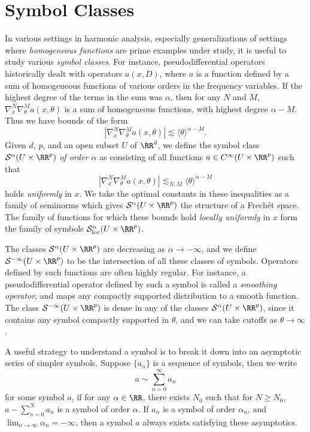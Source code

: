 \chapter{Symbol Classes}

In various settings in harmonic analysis, especially generalizations of settings where \emph{homogeneous functions} are prime examples under study, it is useful to study various \emph{symbol classes}. For instance, pseudodifferential operators historically dealt with operators $a(x,D)$, where $a$ is a function defined by a sum of homogeneous functions of various orders in the frequency variables. If the highest degree of the terms in the sum was $\alpha$, then for any $N$ and $M$, $\nabla^N_x \nabla^M_\theta a(x,\theta)$ is a sum of homogeneous functions, with highest degree $\alpha - M$. Thus we have bounds of the form
%
\[ | \nabla^N_x \nabla^M_\theta a(x,\theta) | \lesssim \langle \theta \rangle^{\alpha - M}. \]
%
Given $d$, $p$, and an open subset $U$ of $\RR^d$, we define the symbol class $\mathcal{S}^\alpha(U \times \RR^p)$ \emph{of order $\alpha$} as consisting of all functions $a \in C^\infty(U \times \RR^p)$ such that
%
\[ |\nabla^N_x \nabla^M_\theta a(x,\theta)| \lesssim_{N,M} \langle \theta \rangle^{\alpha - M} \]
%
holds \emph{uniformly} in $x$. We take the optimal constants in these inequalities as a family of seminorms which gives $\mathcal{S}^\alpha(U \times \RR^p)$ the structure of a Frech\'{e}t space. The family of functions for which these bounds hold \emph{locally uniformly} in $x$ form the family of symbols $\mathcal{S}^\alpha_{\text{loc}}(U \times \RR^p)$.

The classes $\mathcal{S}^\alpha(U \times \RR^p)$ are decreasing as $\alpha \to -\infty$, and we define $\mathcal{S}^{-\infty}(U \times \RR^p)$ to be the intersection of all these classes of symbols. Operators defined by such functions are often highly regular. For instance, a pseudodifferential operator defined by such a symbol is called a \emph{smoothing operator}, and maps any compactly supported distribution to a smooth function. The class $\mathcal{S}^{-\infty}(U \times \RR^p)$ is dense in any of the classes $\mathcal{S}^\alpha(U \times \RR^p)$, since it contains any symbol compactly supported in $\theta$, and we can take cutoffs as $\theta \to \infty$.

A useful strategy to understand a symbol is to break it down into an asymptotic series of simpler symbols. Suppose $\{ a_n \}$ is a sequence of symbols, then we write
%
\[ a \sim \sum_{n = 0}^\infty a_n \]
%
for some symbol $a$, if for any $\alpha \in \RR$, there exists $N_0$ such that for $N \geq N_0$, $a - \sum_{n = 0}^N a_n$ is a symbol of order $\alpha$. If $a_n$ is a symbol of order $\alpha_n$, and $\lim_{n \to \infty} \alpha_n = -\infty$, then a symbol $a$ always exists satisfying these asymptotics.

